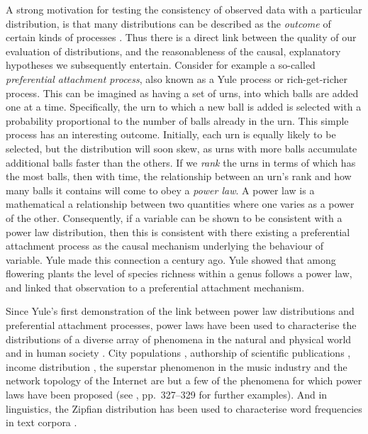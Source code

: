 A strong motivation for testing the consistency of observed data with a particular distribution, is that many distributions can be described as the \emph{outcome} of certain kinds of processes \autocite{frank_how_2014}. Thus there is a direct link between the quality of our evaluation of distributions, and the reasonableness of the causal, explanatory hypotheses we subsequently entertain. Consider for example a so-called \emph{preferential attachment process}, also known as a Yule process or rich-get-richer process. This can be imagined as having a set of urns, into which balls are added one at a time. Specifically, the urn to which a new ball is added is selected with a probability proportional to the number of balls already in the urn. This simple process has an interesting outcome. Initially, each urn is equally likely to be selected, but the distribution will soon skew, as urns with more balls accumulate additional balls faster than the others. If we \emph{rank} the urns in terms of which has the most balls, then with time, the relationship between an urn's rank and how many balls it contains will come to obey a \emph{power law}. A power law is a mathematical a relationship between two quantities where one varies as a power of the other. Consequently, if a variable can be shown to be consistent with a power law distribution, then this is consistent with there existing a preferential attachment process as the causal mechanism underlying the behaviour of variable. Yule \autocites*{yule_mathematical_1925}[see also][]{albert_species_2011} made this connection a century ago. Yule showed that among flowering plants the level of species richness within a genus follows a power law, and linked that observation to a preferential attachment mechanism.

Since Yule's first demonstration of the link between power law distributions and preferential attachment processes, power laws have been used to characterise the distributions of a diverse array of phenomena in the natural and physical world and in human society \autocite[p.~661]{clauset_power-law_2009}. City populations \autocites{gabaix_zipfs_1999}{levy_gibrats_2009}{malevergne_testing_2011}, authorship of scientific publications \autocite{simon_class_1955}, income distribution \autocite{simon_class_1955}, the superstar phenomenon in the music industry \autocite{chung_stochastic_1994} and the network topology of the Internet \autocite{faloutsos_power-law_1999} are but a few of the phenomena for which power laws have been proposed (see \textcite{newman_power_2005}, pp.~327--329 for further examples). And in linguistics, the Zipfian distribution has been used to characterise word frequencies in text corpora \autocites{estoup_gammes_1916}{zipf_selective_1932}{zipf_human_1949}.


